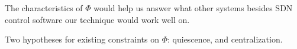 The characteristics of $\Phi$ would help us answer what other systems besides
SDN control software our technique would work well on.

Two hypotheses for existing constraints on $\Phi$: quiescence, and centralization.
